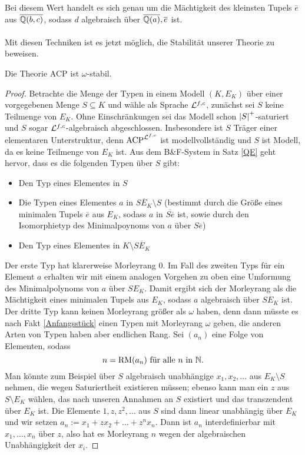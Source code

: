    Bei diesem Wert handelt es sich genau um die Mächtigkeit des kleinsten Tupels $\overline{e}$ aus $\overline{\mathbb{Q}(b,c)}$, sodass $d$ algebraisch über $\overline{\mathbb{Q}(a)},\overline{e}$ ist.\\\\
    Mit diesen Techniken ist es jetzt möglich, die Stabilität unserer Theorie zu beweisen.
    \newpage
    \begin{theorem}
    	Die Theorie ACP ist $\omega$-stabil.
    \end{theorem}
    \begin{proof}
    	Betrachte die Menge der Typen in einem Modell $(K,E_K)$ über einer vorgegebenen Menge $S\subseteq K$ und wähle als Sprache $\mathcal{L}^{f,c}$, zunächst sei $S$ keine Teilmenge von $E_K$. Ohne Einschränkungen sei das Modell schon ${\left| S \right|}^+$-saturiert und $S$ sogar $\mathcal{L}^{f,c}$-algebraisch abgeschlossen. Insbesondere ist $S$ Träger einer elementaren Unterstruktur, denn $\operatorname{ACP}^{\mathcal{L}^{f,c}}$ ist modellvollständig und $S$ ist Modell, da es keine Teilmenge von $E_K$ ist. Aus dem B\&F-System in Satz \ref{QE} geht hervor, dass es die folgenden Typen über $S$ gibt:
    	\begin{itemize}
    		\item Den Typ eines Elementes in $S$
    		\item Die Typen eines Elementes $a$ in $\overline{SE_K}\setminus S$ (bestimmt durch die Größe eines minimalen Tupels $\overline{e}$ aus $E_K$, sodass $a$ in $\overline{S\overline{e}}$ ist, sowie durch den Isomorphietyp des Minimalpoynoms von $a$ über $S\overline{e}$)
    		\item Den Typ eines Elementes in $K\setminus\overline{SE_K}$
    	\end{itemize}
        Der erste Typ hat klarerweise Morleyrang 0. Im Fall des zweiten Typs für ein Element $a$ erhalten wir mit einem analogen Vorgehen zu oben eine Umformung des Minimalpolynoms von $a$ über $SE_K$. Damit ergibt sich der Morleyrang als die Mächtigkeit eines minimalen Tupels aus $E_K$, sodass $a$ algebraisch über $SE_K$ ist.\\
        Der dritte Typ kann keinen Morleyrang größer als $\omega$ haben, denn dann müsste es nach Fakt \ref{Anfangsstück} einen Typen mit Morleyrang $\omega$ geben, die anderen Arten von Typen haben aber endlichen Rang. Sei $(a_n)$ eine Folge von Elementen, sodass $$n=\operatorname{RM}(a_n)\text{ für alle }n\text{ in }\mathbb{N}.$$ Man könnte zum Beispiel über $S$ algebraisch unabhängige $x_1,x_2,\dots$ aus $E_K\setminus S$ nehmen, die wegen Saturiertheit existieren müssen; ebenso kann man ein $z$ aus $S\setminus E_K$ wählen, das nach unseren Annahmen an $S$ existiert und das transzendent über $E_K$ ist. Die Elemente $1,z,z^2,\dots$ aus $S$ sind dann linear unabhängig über $E_K$ und wir setzen $a_n:=x_1+zx_2+\dots+z^nx_n$. Dann ist $a_n$ interdefinierbar mit $x_1,\dots,x_n$ über $z$, also hat es Morleyrang $n$ wegen der algebraischen Unabhängigkeit der $x_i$.\newpage

\end{proof}
